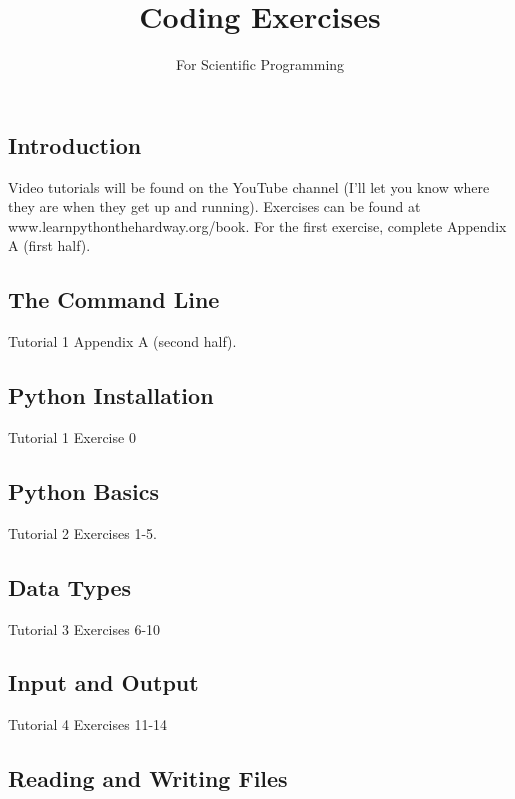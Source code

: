 \documentclass[12pt,a4paper,article]{memoir} %
\title{Coding Exercises}
\author{For Scientific Programming}
\date{} %
\begin{document}
\maketitle
\tableofcontents* %

\chapter{}
\section{Introduction}

Video tutorials will be found on the YouTube channel (I'll let you know where they are when they get up and running). Exercises can be found at www.learnpythonthehardway.org/book. For the first exercise, complete Appendix A (first half).

\section{The Command Line}

Tutorial 1
Appendix A (second half).

\section{Python Installation}

Tutorial 1
Exercise 0

\section{Python Basics}

Tutorial 2
Exercises 1-5.

\section{Data Types}

Tutorial 3
Exercises 6-10

\section{Input and Output}

Tutorial 4
Exercises 11-14

\section{Reading and Writing Files}
\end{document}
